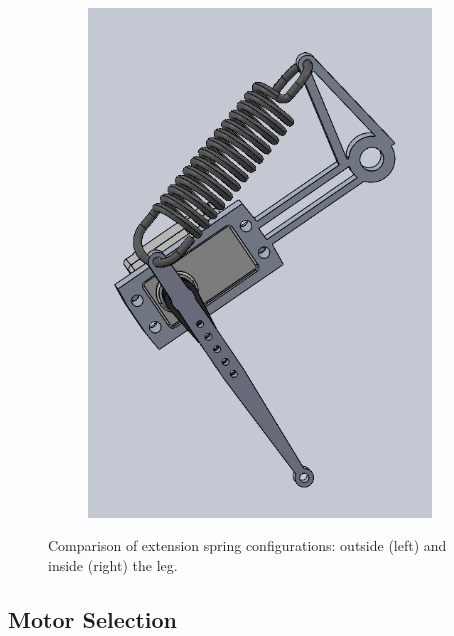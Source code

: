 \begin{figure}[h!]
\begin{subfigure}[b]{0.45\textwidth}
        \label{fig:extension_spring_outside}
    \end{subfigure}
    \hfill
    \begin{subfigure}[b]{0.45\textwidth}
        \includegraphics[width=\textwidth]{Images/extension_spring_inside.png}

        \label{fig:extension_spring_inside}
    \end{subfigure}
    \caption{Comparison of extension spring configurations: outside (left) and inside (right) the leg.}
    \label{fig:extension_spring_CAD}
\end{figure}

\subsection{Motor Selection}

